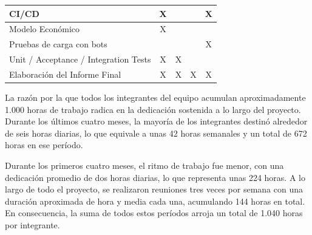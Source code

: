 \begin{table}[h]
{\begin{tabular}{|l|c|c|c|c|}
\hline
CI/CD                                  & X                          &                          &                          & X                      \\
\hline
Modelo Económico                       & X                          &                          &                          &                        \\
\hline
Pruebas de carga con bots              &                            &                          &                          & X                      \\
\hline
Unit / Acceptance / Integration Tests  & X                          & X                        &                          &                        \\
\hline
Elaboración del Informe Final          & X                          & X                        & X                        & X                      \\
\hline
\end{tabular}
}
\end{table}

La razón por la que todos los integrantes del equipo acumulan aproximadamente 1.000 horas de trabajo radica en la dedicación 
sostenida a lo largo del proyecto. Durante los últimos cuatro meses, la mayoría de los integrantes destinó alrededor de 
seis horas diarias, lo que equivale a unas 42 horas semanales y un total de 672 horas en ese período. 

\vspace{0.25cm}

Durante los primeros cuatro meses, el ritmo de trabajo fue menor, con una dedicación promedio de dos horas diarias, lo que representa unas 224 horas. 
A lo largo de todo el proyecto, se realizaron reuniones tres veces por semana con una duración aproximada de hora y media
cada una, acumulando 144 horas en total. En consecuencia, la suma de todos estos períodos arroja un total de 1.040 horas 
por integrante.
